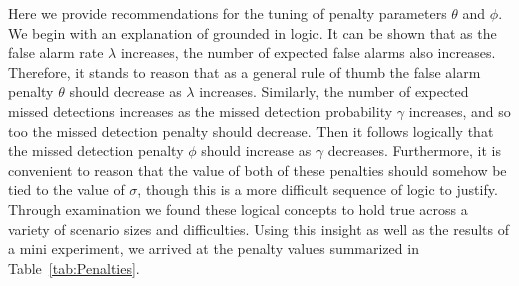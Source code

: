 Here we provide recommendations for the tuning of penalty parameters $\theta$ and $\phi$. We begin with an explanation of grounded in logic. It can be shown that as the false alarm rate $\lambda$ increases, the number of expected false alarms also increases. Therefore, it stands to reason that as a general rule of thumb the false alarm penalty $\theta$ should decrease as $\lambda$ increases. Similarly, the number of expected missed detections increases as the missed detection probability $\gamma$ increases, and so too the missed detection penalty should decrease. Then it follows logically that the missed detection penalty $\phi$ should increase as $\gamma$ decreases. Furthermore, it is convenient to reason that the value of both of these penalties should somehow be tied to the value of $\sigma$, though this is a more difficult sequence of logic to justify. Through examination we found these logical concepts to hold true across a variety of scenario sizes and difficulties. Using this insight as well as the results of a mini experiment, we arrived at the penalty values summarized in Table~\ref{tab:Penalties}.


